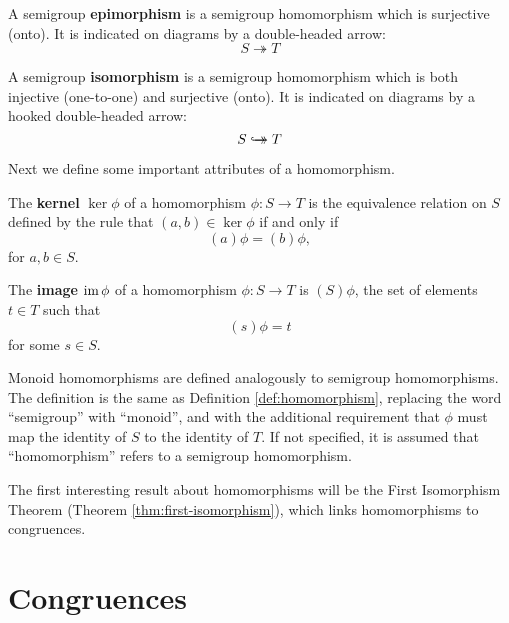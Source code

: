 \begin{definition}
  \label{def:epimorphism}
  A semigroup \textbf{epimorphism} is a semigroup homomorphism which is
  surjective (onto).  It is indicated on diagrams by a double-headed arrow:
  $$S \twoheadrightarrow T$$
\end{definition}

\begin{definition}
  \label{def:isomorphism}
  A semigroup \textbf{isomorphism} is a semigroup homomorphism which is
  both injective (one-to-one) and surjective (onto).  It is indicated on
  diagrams by a hooked double-headed arrow:
  $$S \hookrightarrow\mathrel{\mspace{-15mu}}\rightarrow T$$
\end{definition}

Next we define some important attributes of a homomorphism.

\begin{definition}
  \label{def:kernel-homo}
  The \textbf{kernel} $\ker\phi$ of a homomorphism $\phi:S \to T$ is the
  equivalence relation on $S$ defined by the rule that $(a,b) \in \ker\phi$ if
  and only if
  $$(a)\phi = (b)\phi,$$
  for $a, b \in S$.
\end{definition}

\begin{definition}
  \label{def:image}
  The \textbf{image} $\operatorname{im}\phi$ of a homomorphism $\phi:S \to T$ is $(S)\phi$,
  the set of elements $t \in T$ such that
  $$(s)\phi = t$$
  for some $s \in S$.
\end{definition}

Monoid homomorphisms are defined analogously to semigroup homomorphisms.  The
definition is the same as Definition \ref{def:homomorphism}, replacing the word
``semigroup'' with ``monoid'', and with the additional requirement that $\phi$
must map the identity of $S$ to the identity of $T$.  If not specified, it is
assumed that ``homomorphism'' refers to a semigroup homomorphism.

The first interesting result about homomorphisms will be the First Isomorphism
Theorem (Theorem \ref{thm:first-isomorphism}), which links homomorphisms to
congruences.

\section{Congruences}
\label{sec:intro-congs}

